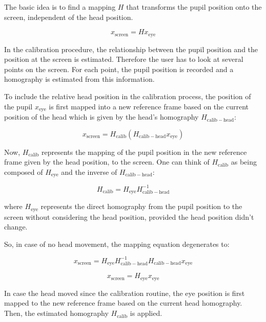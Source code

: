 The basic idea is to find a mapping $H$ that transforms the pupil position onto the screen, independent of the head position.

\begin{equation}
  x_\mathrm{screen} = H x_\mathrm{eye}
  \label{eq:basic}
\end{equation}

In the calibration procedure, the relationship between the pupil position and the position at the screen is estimated. Therefore the user has to look at several points on the screen. For each point, the pupil position is recorded and a homography is estimated from this information.

To include the relative head position in the calibration process, the position of the pupil $x_\mathrm{eye}$ is first mapped into a new reference frame based on the current position of the head which is given by the head's homography $H_\mathrm{calib-head}$:

\begin{equation}
  x_\mathrm{screen} = H_\mathrm{calib} (H_\mathrm{calib-head} x_\mathrm{eye})
\end{equation}

Now, $H_\mathrm{calib}$ represents the mapping of the pupil position in the new reference frame given by the head position, to the screen. One can think of $H_\mathrm{calib}$ as being composed of $H_\mathrm{eye}$ and the inverse of $H_\mathrm{calib-head}$:

\begin{equation}
  H_\mathrm{calib} = H_\mathrm{eye} H_\mathrm{calib-head} ^{-1}
\end{equation}

where $H_\mathrm{eye}$ represents the direct homography from the pupil position to the screen without considering the head position, provided the head position didn't change.

So, in case of no head movement, the mapping equation degenerates to:

\begin{equation}
  x_\mathrm{screen} = H_\mathrm{eye} H_\mathrm{calib-head} ^{-1} H_\mathrm{calib-head} x_\mathrm{eye}
\end{equation}

\begin{equation}
  x_\mathrm{screen} = H_\mathrm{eye}  x_\mathrm{eye}
\end{equation}

In case the head moved since the calibration routine, the eye position is first mapped to the new reference frame based on the current head homography. Then, the estimated homography $H_\mathrm{calib}$ is applied.

